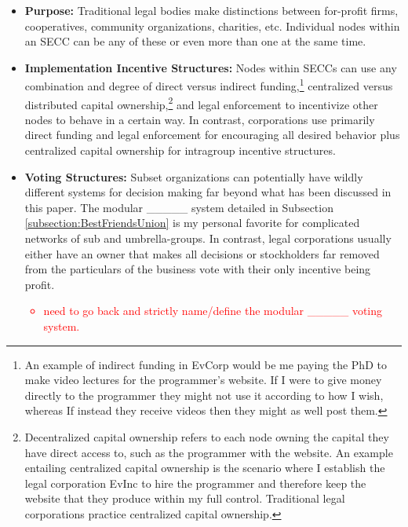\documentclass{article}[10pt]
\begin{document}
\begin{itemize}
    \item \textbf{Purpose:} 
    Traditional legal bodies make distinctions between for-profit firms, cooperatives, community organizations, charities, etc. Individual nodes within an SECC can be any of these or even more than one at the same time.

    \item \textbf{Implementation Incentive Structures:} 
    Nodes within SECCs can use any combination and degree of direct versus indirect funding,\footnote{
        An example of indirect funding in EvCorp would be me paying the PhD to make video lectures for the programmer's website.
        If I were to give money directly to the programmer they might not use it according to how I wish, whereas If instead they receive videos then they might as well post them.} 
    centralized versus distributed capital ownership,\footnote{
        Decentralized capital ownership refers to each node owning the capital they have direct access to, such as the programmer with the website.
        An example entailing centralized capital ownership is the scenario where I establish the legal corporation EvInc to hire the programmer and therefore keep the website that they produce within my full control.
        Traditional legal corporations practice centralized capital ownership.}
    and legal enforcement to incentivize other nodes to behave in a certain way.
    In contrast, corporations use primarily direct funding and legal enforcement for encouraging all desired behavior plus centralized capital ownership for intragroup incentive structures.

    \item \textbf{Voting Structures:} 
    Subset organizations can potentially have wildly different systems for decision making far beyond what has been discussed in this paper.
    The modular \_\_\_\_\_ system detailed in Subsection \ref{subsection:BestFriendsUnion} is my personal favorite for complicated networks of sub and umbrella-groups.
    In contrast, legal corporations usually either have an owner that makes all decisions or stockholders far removed from the particulars of the business vote with their only incentive being profit.
    \textcolor{red}{\begin{itemize}
        \item need to go back and strictly name/define the modular \_\_\_\_\_ voting system.
    \end{itemize}}


\end{itemize}
\end{document}
